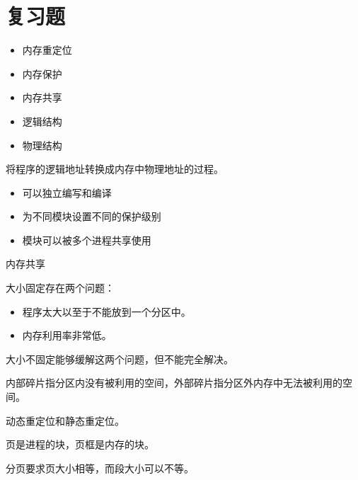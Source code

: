 
\section{复习题}
{
    \begin{reviewc}
        \begin{itemize}
            \item 内存重定位
            \item 内存保护
            \item 内存共享
            \item 逻辑结构
            \item 物理结构
        \end{itemize}
    \end{reviewc}

    \begin{reviewc}
        将程序的逻辑地址转换成内存中物理地址的过程。
    \end{reviewc}

    \begin{reviewc}
        \begin{itemize}
            \item 可以独立编写和编译
            \item 为不同模块设置不同的保护级别
            \item 模块可以被多个进程共享使用
        \end{itemize}
    \end{reviewc}

    \begin{reviewc}
        内存共享
    \end{reviewc}

    \begin{reviewc}
        大小固定存在两个问题：

        \begin{itemize}
            \item 程序太大以至于不能放到一个分区中。
            \item 内存利用率非常低。
        \end{itemize}

        大小不固定能够缓解这两个问题，但不能完全解决。
    \end{reviewc}

    \begin{reviewc}
        内部碎片指分区内没有被利用的空间，外部碎片指分区外内存中无法被利用的空间。
    \end{reviewc}

    \begin{reviewc}
        动态重定位和静态重定位。
    \end{reviewc}

    \begin{reviewc}
        页是进程的块，页框是内存的块。
    \end{reviewc}

    \begin{reviewc}
        分页要求页大小相等，而段大小可以不等。
    \end{reviewc}
}

